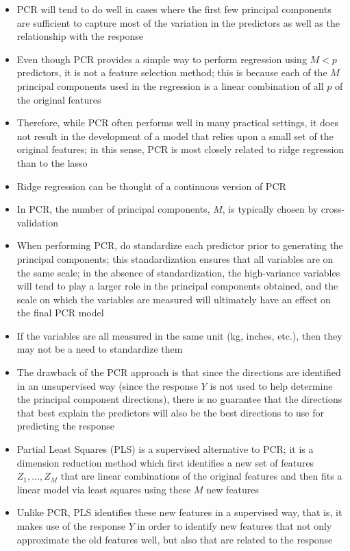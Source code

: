 \documentclass[12pt]{article}
\begin{document}
\begin{itemize}
\item PCR will tend to do well in cases where the first few principal components are sufficient to capture most of the variation in the predictors as well as the relationship with the response 
\item Even though PCR provides a simple way to perform regression using $M < p$ predictors, it is not a feature selection method; this is because each of the $M$ principal components used in the regression is a linear combination of all $p$ of the original features 
\item Therefore, while PCR often performs well in many practical settings, it does not result in the development of a model that relies upon a small set of the original features; in this sense, PCR is most closely related to ridge regression than to the lasso 
\item Ridge regression can be thought of a continuous version of PCR 
\item In PCR, the number of principal components, $M$, is typically chosen by cross-validation 
\item When performing PCR, do standardize each predictor prior to generating the principal components; this standardization ensures that all variables are on the same scale; in the absence of standardization, the high-variance variables will tend to play a larger role in the principal components obtained, and the scale on which the variables are measured will ultimately have an effect on the final PCR model 
\item If the variables are all measured in the same unit (kg, inches, etc.), then they may not be a need to standardize them 
\item The drawback of the PCR approach is that since the directions are identified in an unsupervised way (since the response $Y$ is not used to help determine the principal component directions), there is no guarantee that the directions that best explain the predictors will also be the best directions to use for predicting the response 
\item Partial Least Squares (PLS) is a supervised alternative to PCR; it is a dimension reduction method which first identifies a new set of features $Z_1,\dots,Z_M$ that are linear combinations of the original features and then fits a linear model via least squares using these $M$ new features
\item Unlike PCR, PLS identifies these new features in a supervised way, that is, it makes use of the response $Y$ in order to identify new features that not only approximate the old features well, but also that are related to the response 

\end{itemize}
\end{document}
